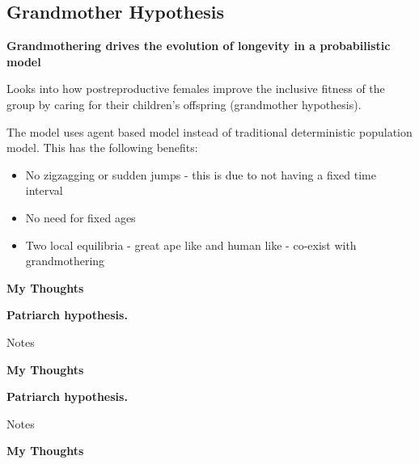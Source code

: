 \documentclass[authoryearcitations]{UoYCSproject}
\begin{document}
\subsection{Grandmother Hypothesis}
\begin{framed}
\noindent \textbf{Grandmothering drives the evolution of longevity in a probabilistic model \cite{grandmotheringProbabilistic2014}}

Looks into how postreproductive females improve the inclusive fitness of the group by caring for their children's offspring (grandmother hypothesis).

The model uses agent based model instead of traditional deterministic population model. This has the following benefits:
\begin{itemize}
    \item No zigzagging or sudden jumps - this is due to not having a fixed time interval
    \item No need for fixed ages
    \item Two local equilibria - great ape like and human like - co-exist with grandmothering
\end{itemize}



\noindent \textbf{My Thoughts}

\end{framed}

\begin{framed}
\noindent \textbf{Patriarch hypothesis. \cite{patriarchHypothesis2000}}

Notes

\noindent \textbf{My Thoughts}


\end{framed}

\begin{framed}
\noindent \textbf{Patriarch hypothesis. \cite{patriarchHypothesis2000}}

Notes

\noindent \textbf{My Thoughts}


\end{framed}
\end{document}
